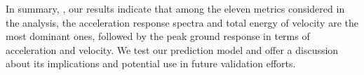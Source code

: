 
In summary, , our results indicate that 
among the eleven metrics considered in the analysis, the acceleration response spectra and total energy of velocity are the most dominant ones, followed by the peak ground response in terms of acceleration and velocity. We test our prediction model and offer a discussion about its implications and potential use in future validation efforts.
